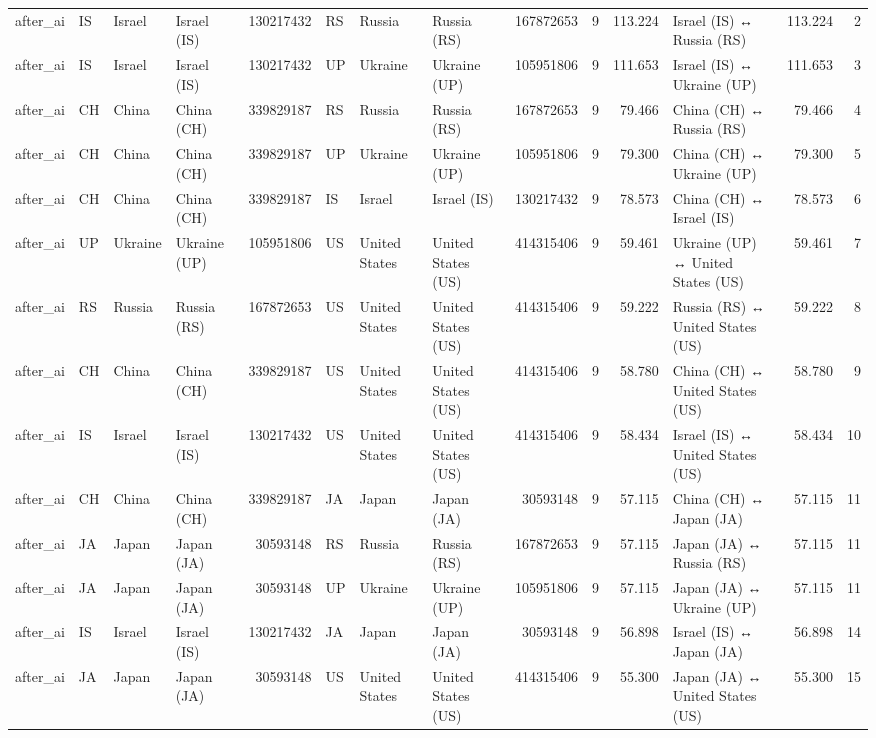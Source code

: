 \begin{tabular}{llllrlllrrrlrr}
after\_ai & IS & Israel & Israel (IS) & 130217432 & RS & Russia & Russia (RS) & 167872653 & 9 & 113.224 & Israel (IS) ↔ Russia (RS) & 113.224 & 2 \\
after\_ai & IS & Israel & Israel (IS) & 130217432 & UP & Ukraine & Ukraine (UP) & 105951806 & 9 & 111.653 & Israel (IS) ↔ Ukraine (UP) & 111.653 & 3 \\
after\_ai & CH & China & China (CH) & 339829187 & RS & Russia & Russia (RS) & 167872653 & 9 & 79.466 & China (CH) ↔ Russia (RS) & 79.466 & 4 \\
after\_ai & CH & China & China (CH) & 339829187 & UP & Ukraine & Ukraine (UP) & 105951806 & 9 & 79.300 & China (CH) ↔ Ukraine (UP) & 79.300 & 5 \\
after\_ai & CH & China & China (CH) & 339829187 & IS & Israel & Israel (IS) & 130217432 & 9 & 78.573 & China (CH) ↔ Israel (IS) & 78.573 & 6 \\
after\_ai & UP & Ukraine & Ukraine (UP) & 105951806 & US & United States & United States (US) & 414315406 & 9 & 59.461 & Ukraine (UP) ↔ United States (US) & 59.461 & 7 \\
after\_ai & RS & Russia & Russia (RS) & 167872653 & US & United States & United States (US) & 414315406 & 9 & 59.222 & Russia (RS) ↔ United States (US) & 59.222 & 8 \\
after\_ai & CH & China & China (CH) & 339829187 & US & United States & United States (US) & 414315406 & 9 & 58.780 & China (CH) ↔ United States (US) & 58.780 & 9 \\
after\_ai & IS & Israel & Israel (IS) & 130217432 & US & United States & United States (US) & 414315406 & 9 & 58.434 & Israel (IS) ↔ United States (US) & 58.434 & 10 \\
after\_ai & CH & China & China (CH) & 339829187 & JA & Japan & Japan (JA) & 30593148 & 9 & 57.115 & China (CH) ↔ Japan (JA) & 57.115 & 11 \\
after\_ai & JA & Japan & Japan (JA) & 30593148 & RS & Russia & Russia (RS) & 167872653 & 9 & 57.115 & Japan (JA) ↔ Russia (RS) & 57.115 & 11 \\
after\_ai & JA & Japan & Japan (JA) & 30593148 & UP & Ukraine & Ukraine (UP) & 105951806 & 9 & 57.115 & Japan (JA) ↔ Ukraine (UP) & 57.115 & 11 \\
after\_ai & IS & Israel & Israel (IS) & 130217432 & JA & Japan & Japan (JA) & 30593148 & 9 & 56.898 & Israel (IS) ↔ Japan (JA) & 56.898 & 14 \\
after\_ai & JA & Japan & Japan (JA) & 30593148 & US & United States & United States (US) & 414315406 & 9 & 55.300 & Japan (JA) ↔ United States (US) & 55.300 & 15 \\

\end{tabular}
